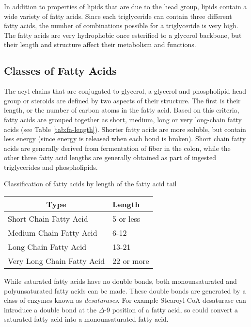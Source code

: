 \documentclass{tufte-handout}
\begin{document}
In addition to properties of lipids that are due to the head group, lipids contain a wide variety of fatty acids.  Since each triglyceride can contain three different fatty acids, the number of combinations possible for a triglyceride is very high.  The fatty acids are very hydrophobic once esterified to a glycerol backbone, but their length and structure affect their metabolism and functions.

\subsection{Classes of Fatty Acids}

The acyl chains that are conjugated to glycerol, a glycerol and phospholipid head group or steroids are defined by two aspects of their structure.  The first is their length, or the number of carbon atoms in the fatty acid.  Based on this criteria, fatty acids are grouped together as short, medium, long or very long-chain fatty acids (see Table \ref{tab:fa-length}).  Shorter fatty acids are more soluble, but contain less energy (since energy is released when each bond is broken).  Short chain fatty acids are generally derived from fermentation of fiber in the colon, while the other three fatty acid lengths are generally obtained as part of ingested triglycerides and phospholipids.

\begin{margintable}
\centering
\caption{Classification of fatty acids by length of the fatty acid tail}
\label{tab:fa-length}
\begin{tabular}{ll}
\hline
\multicolumn{1}{c}{\textbf{Type}} & \textbf{Length} \\ \hline
Short Chain Fatty Acid            & 5 or less       \\
Medium Chain Fatty Acid           & 6-12            \\
Long Chain Fatty Acid             & 13-21           \\
Very Long Chain Fatty Acid        & 22 or more     
\end{tabular}
\end{margintable}

  While saturated fatty acids have no double bonds, both monounsaturated and polyunsaturated fatty acids can be made.  These double bonds are generated by a class of enzymes known as \emph{desaturases}.  For example Stearoyl-CoA desaturase can introduce a double bond at the $\Delta$-9 position of a fatty acid, so could convert a saturated fatty acid into a monounsaturated fatty acid.
\end{document}
